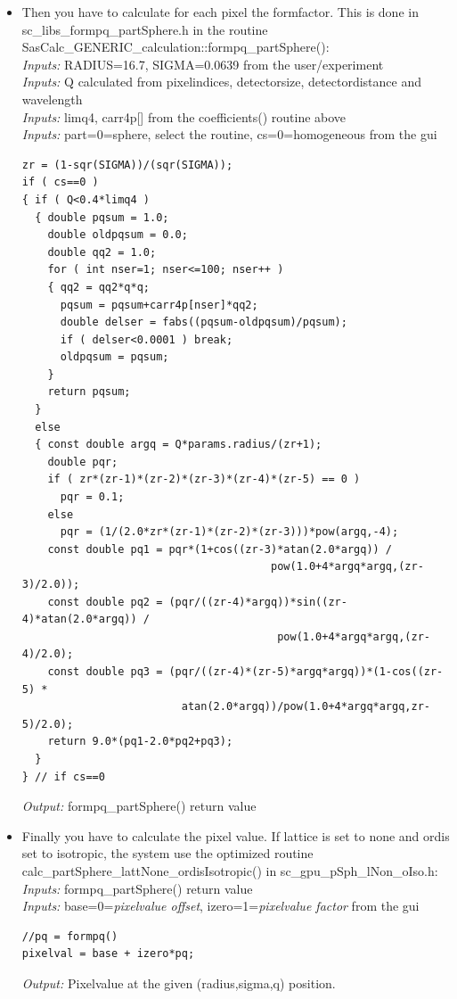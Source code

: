 \documentclass[11pt]{article} %
\begin{document}
\begin{itemize}
\item Then you have to calculate for each pixel the formfactor. This is done in sc\_libs\_formpq\_partSphere.h in the routine SasCalc\_GENERIC\_calculation::formpq\_partSphere(): \\
{\it Inputs:} RADIUS{\small =16.7}, SIGMA{\small =0.0639} from the user/experiment \\
{\it Inputs:} Q calculated from pixelindices, detectorsize, detectordistance and wavelength \\
{\it Inputs:} limq4, carr4p[] from the coefficients() routine above \\
{\it Inputs:} part=0{\small =sphere, select the routine}, cs=0{\small =homogeneous} from the gui
\begin{lstlisting}[frame=single]
zr = (1-sqr(SIGMA))/(sqr(SIGMA));
if ( cs==0 )
{ if ( Q<0.4*limq4 )
  { double pqsum = 1.0;
    double oldpqsum = 0.0;
    double qq2 = 1.0;
    for ( int nser=1; nser<=100; nser++ )
    { qq2 = qq2*q*q;
      pqsum = pqsum+carr4p[nser]*qq2;
      double delser = fabs((pqsum-oldpqsum)/pqsum);
      if ( delser<0.0001 ) break;
      oldpqsum = pqsum;
    }
    return pqsum;
  }
  else
  { const double argq = Q*params.radius/(zr+1);
    double pqr;
    if ( zr*(zr-1)*(zr-2)*(zr-3)*(zr-4)*(zr-5) == 0 )
      pqr = 0.1;
    else
      pqr = (1/(2.0*zr*(zr-1)*(zr-2)*(zr-3)))*pow(argq,-4);
    const double pq1 = pqr*(1+cos((zr-3)*atan(2.0*argq)) / 
                                       pow(1.0+4*argq*argq,(zr-3)/2.0));
    const double pq2 = (pqr/((zr-4)*argq))*sin((zr-4)*atan(2.0*argq)) /
                                        pow(1.0+4*argq*argq,(zr-4)/2.0);
    const double pq3 = (pqr/((zr-4)*(zr-5)*argq*argq))*(1-cos((zr-5) *
                         atan(2.0*argq))/pow(1.0+4*argq*argq,zr-5)/2.0);
    return 9.0*(pq1-2.0*pq2+pq3);
  }
} // if cs==0
\end{lstlisting}
{\it Output:} formpq\_partSphere() return value

\item Finally you have to calculate the pixel value. If lattice is set to none and ordis set to isotropic, the system use the optimized routine calc\_partSphere\_lattNone\_ordisIsotropic() in sc\_gpu\_pSph\_lNon\_oIso.h: \\
{\it Inputs:} formpq\_partSphere() return value \\
{\it Inputs:} base=0={\it pixelvalue offset}, izero=1={\it pixelvalue factor} from the gui
\begin{lstlisting}[frame=single]
//pq = formpq()
pixelval = base + izero*pq;
\end{lstlisting}
{\it Output:} Pixelvalue at the given (radius,sigma,q) position.


\end{itemize}
\end{document}
